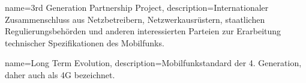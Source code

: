 {
    name=3rd Generation Partnership Project,
    description={Internationaler Zusammenschluss aus Netzbetreibern, Netzwerkausrüstern, staatlichen Regulierungsbehörden und anderen interessierten Parteien zur Erarbeitung technischer Spezifikationen des Mobilfunks.}
}

{
    name=Long Term Evolution,
    description={Mobilfunkstandard der 4. Generation, daher auch als 4G bezeichnet.}
}